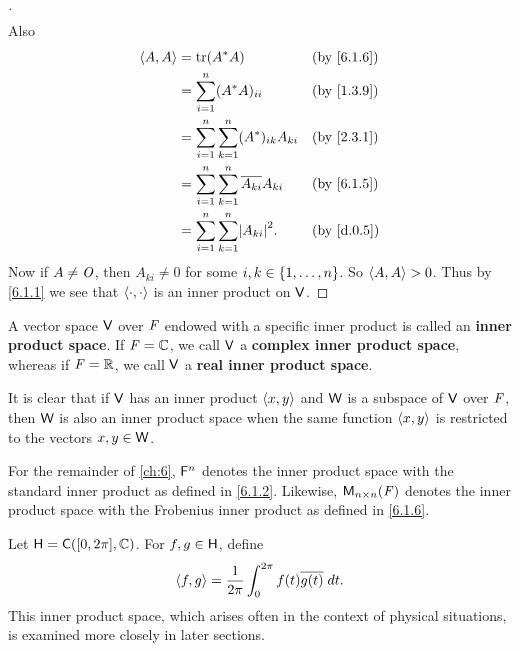 \begin{proof}[]
\begin{align*}
  \end{align*}
  Also
  \begin{align*}
    \inn{A, A} & = \tr(A^* A)                                           &  & \text{(by \cref{6.1.6})} \\
               & = \sum_{i = 1}^n (A^* A)_{i i}                         &  & \text{(by \cref{1.3.9})} \\
               & = \sum_{i = 1}^n \sum_{k = 1}^n (A^*)_{i k} A_{k i}    &  & \text{(by \cref{2.3.1})} \\
               & = \sum_{i = 1}^n \sum_{k = 1}^n \conj{A_{k i}} A_{k i} &  & \text{(by \cref{6.1.5})} \\
               & = \sum_{i = 1}^n \sum_{k = 1}^n \abs{A_{k i}}^2.       &  & \text{(by \cref{d.0.5})}
  \end{align*}
  Now if \(A \neq \mathit{O}\), then \(A_{k i} \neq 0\) for some \(i, k \in \left\lbrace1, \dots, n\right\rbrace\).
  So \(\left\langle A, A\right\rangle > 0\).
  Thus by \cref{6.1.1} we see that \(\left\langle\cdot, \cdot\right\rangle\) is an inner product on \(\mathsf{V}\).
\end{proof}

\begin{defn}\label{6.1.7}
  A vector space \(\mathsf{V}\) over \(\mathit{F}\) endowed with a specific inner product is called an \textbf{inner product space}.
  If \(\mathit{F} = \mathbb{C}\), we call \(\mathsf{V}\) a \textbf{complex inner product space}, whereas if \(\mathit{F} = \mathbb{R}\), we call \(\mathsf{V}\) a \textbf{real inner product space}.

  It is clear that if \(\mathsf{V}\) has an inner product \(\left\langle x, y\right\rangle\) and \(\mathsf{W}\) is a subspace of \(\mathsf{V}\) over \(\mathit{F}\), then \(\mathsf{W}\) is also an inner product space when the same function \(\left\langle x, y\right\rangle\) is restricted to the vectors \(x, y \in \mathsf{W}\).
\end{defn}

\begin{note}
  For the remainder of \cref{ch:6}, \(\mathsf{F}^n\) denotes the inner product space with the standard inner product as defined in \cref{6.1.2}.
  Likewise, \(\mathsf{M}_{{n} \times n}({\mathit{F}})\) denotes the inner product space with the Frobenius inner product as defined in \cref{6.1.6}.
\end{note}

\begin{eg}\label{6.1.8}
  Let \(\vs{H} = \cfs([0, 2\pi], \C)\).
  For \(f, g \in \mathsf{H}\), define
  \[
    \left\langle f, g\right\rangle = \frac{1}{2\pi} \int_0^{2\pi} f(t) \overline{g(t)} \; dt.
  \]
  This inner product space, which arises often in the context of physical situations, is examined more closely in later sections.
\end{eg}

